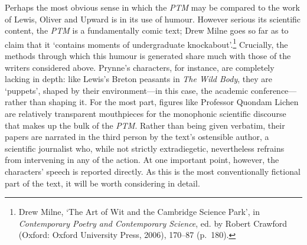 \documentclass[]{article}
\begin{document}
Perhaps the most obvious sense in which the \emph{PTM} may be compared
to the work of Lewis, Oliver and Upward is in its use of humour. However
serious its scientific content, the \emph{PTM} is a fundamentally comic
text; Drew Milne goes so far as to claim that it ‘contains moments of
undergraduate knockabout’.\footnote{Drew Milne, ‘The Art of Wit and the
  Cambridge Science Park’, in \emph{Contemporary Poetry and Contemporary
  Science}, ed. by Robert Crawford (Oxford: Oxford University Press,
  2006), 170–87 (p.~180).} Crucially, the methods through which this
humour is generated share much with those of the writers considered
above. Prynne’s characters, for instance, are completely lacking in
depth: like Lewis’s Breton peasants in \emph{The Wild Body}, they are
‘puppets’, shaped by their environment—in this case, the academic
conference—rather than shaping it. For the most part, figures like
Professor Quondam Lichen are relatively transparent mouthpieces for the
monophonic scientific discourse that makes up the bulk of the
\emph{PTM}. Rather than being given verbatim, their papers are narrated
in the third person by the text’s ostensible author, a scientific
journalist who, while not strictly extradiegetic, nevertheless refrains
from intervening in any of the action. At one important point, however,
the characters’ speech is reported directly. As this is the most
conventionally fictional part of the text, it will be worth considering
in detail.
\end{document}
